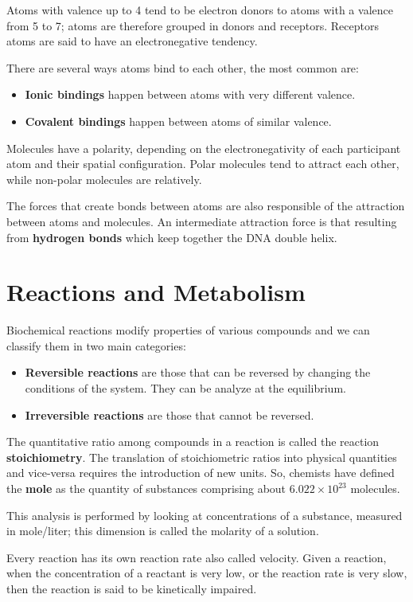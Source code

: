 Atoms with valence up to 4 tend to be electron donors to atoms with a valence
from 5 to 7; atoms are therefore grouped in donors and receptors. Receptors atoms
are said to have an electronegative tendency.

There are several ways atoms bind to each other, the most common are:
\begin{itemize}
    \item \textbf{Ionic bindings} happen between atoms with very different valence.
    \item \textbf{Covalent bindings} happen between atoms of similar valence.
\end{itemize}

Molecules have a polarity, depending on the electronegativity of each participant
atom and their spatial configuration. Polar molecules tend to attract each other,
while non-polar molecules are relatively.

The forces that create bonds between atoms are also responsible of the attraction
between atoms and molecules. An intermediate attraction force is that resulting
from \textbf{hydrogen bonds} which keep together the DNA double helix.
\section{Reactions and Metabolism}
Biochemical reactions modify properties of various compounds and we can classify
them in two main categories:
\begin{itemize}
    \item \textbf{Reversible reactions} are those that can be reversed by changing
          the conditions of the system. They can be analyze at the equilibrium.
    \item \textbf{Irreversible reactions} are those that cannot be reversed.
\end{itemize}
The quantitative ratio among compounds in a reaction is called the reaction
\textbf{stoichiometry}.
The translation of stoichiometric ratios into physical quantities and vice-versa
requires the introduction of new units. So, chemists have defined the \textbf{mole}
as the quantity of substances comprising about $6.022 \times 10^{23}$ molecules.

This analysis is performed by looking at concentrations of a substance, measured
in mole/liter; this dimension is called the molarity of a solution.

Every reaction has its own reaction rate also called velocity. Given a reaction,
when the concentration of a reactant is very low, or the reaction rate is very
slow, then the reaction is said to be kinetically impaired.

